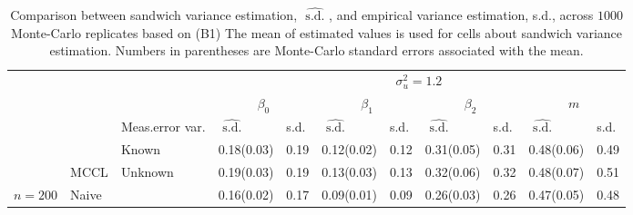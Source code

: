 \begin{table}

\caption{Comparison between sandwich variance estimation, $\widehat{\text { s.d. }}$, and empirical variance estimation, s.d., across $1000$ Monte-Carlo replicates based on (B1) The mean of estimated values is used for cells about sandwich variance estimation. Numbers in parentheses are Monte-Carlo standard errors associated with the mean.}
\centering
\begin{tabular}[t]{lllllllllll}
\toprule
\multicolumn{3}{c}{ } & \multicolumn{8}{c}{$\sigma^2_u=1.2$} \\
\cmidrule(l{3pt}r{3pt}){4-11}
\multicolumn{3}{c}{ } & \multicolumn{2}{c}{$\beta_0$} & \multicolumn{2}{c}{$\beta_1$} & \multicolumn{2}{c}{$\beta_2$} & \multicolumn{2}{c}{$m$} \\
\cmidrule(l{3pt}r{3pt}){4-5} \cmidrule(l{3pt}r{3pt}){6-7} \cmidrule(l{3pt}r{3pt}){8-9} \cmidrule(l{3pt}r{3pt}){10-11}
 &  & Meas.error var. & $\widehat{\text { s.d. }}$ & s.d. & $\widehat{\text { s.d. }}$ & s.d. & $\widehat{\text { s.d. }}$ & s.d. & $\widehat{\text { s.d. }}$ & s.d.\\
\midrule
 &  & Known & 0.18(0.03) & 0.19 & 0.12(0.02) & 0.12 & 0.31(0.05) & 0.31 & 0.48(0.06) & 0.49\\

 & \multirow{-2}{*}{\raggedright\arraybackslash MCCL} & Unknown & 0.19(0.03) & 0.19 & 0.13(0.03) & 0.13 & 0.32(0.06) & 0.32 & 0.48(0.07) & 0.51\\

\multirow{-3}{*}{\raggedright\arraybackslash $n=200$} & Naive &  & 0.16(0.02) & 0.17 & 0.09(0.01) & 0.09 & 0.26(0.03) & 0.26 & 0.47(0.05) & 0.48\\
\bottomrule
\end{tabular}
\end{table}
